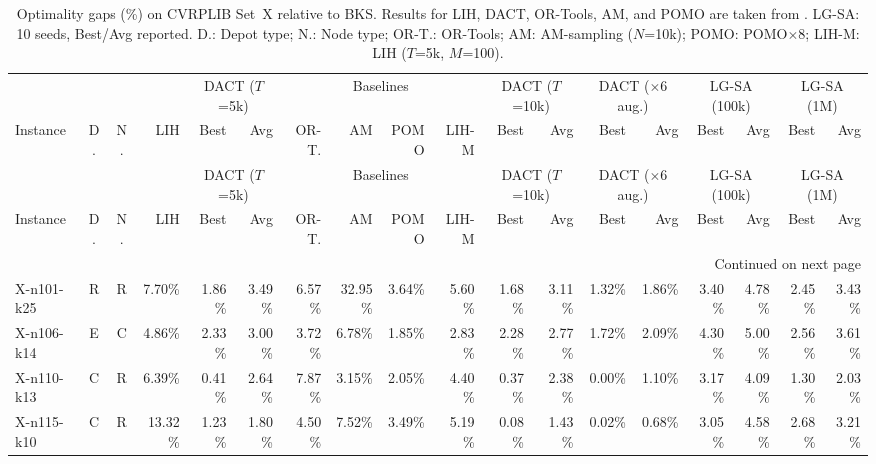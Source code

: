 \documentclass[letterpaper]{article} %
\begin{document}
\clearpage
\onecolumn
\begin{landscape}
\centering
\scriptsize
\setlength{\tabcolsep}{3pt}
\begin{longtable}{@{}l c c r rr rrrr rr rr rr rr@{}}
\caption{Optimality gaps (\%) on CVRPLIB Set~X \citep{uchoa_new_2017} relative to BKS. Results for LIH, DACT, OR-Tools, AM, and POMO are taken from \citet{ma_learning_2021}. LG-SA: 10 seeds, Best/Avg reported. D.: Depot type; N.: Node type; OR-T.: OR-Tools; AM: AM-sampling ($N$=10k); POMO: POMO$\times$8; LIH-M: LIH ($T$=5k, $M$=100).}
\label{tab:uchoa_benchmark} \\
\toprule
& & & & \multicolumn{2}{c}{DACT ($T$=5k)} & \multicolumn{4}{c}{Baselines} & \multicolumn{2}{c}{DACT ($T$=10k)} & \multicolumn{2}{c}{DACT ($\times$6 aug.)} & \multicolumn{2}{c}{LG-SA (100k)} & \multicolumn{2}{c}{LG-SA (1M)} \\
\cmidrule(lr){5-6}\cmidrule(lr){7-10}\cmidrule(lr){11-12}\cmidrule(lr){13-14}\cmidrule(lr){15-16}\cmidrule(lr){17-18}
Instance & D. & N. & LIH & Best & Avg & OR-T. & AM & POMO & LIH-M & Best & Avg & Best & Avg & Best & Avg & Best & Avg \\
\midrule
\endfirsthead
\toprule
& & & & \multicolumn{2}{c}{DACT ($T$=5k)} & \multicolumn{4}{c}{Baselines} & \multicolumn{2}{c}{DACT ($T$=10k)} & \multicolumn{2}{c}{DACT ($\times$6 aug.)} & \multicolumn{2}{c}{LG-SA (100k)} & \multicolumn{2}{c}{LG-SA (1M)} \\
\cmidrule(lr){5-6}\cmidrule(lr){7-10}\cmidrule(lr){11-12}\cmidrule(lr){13-14}\cmidrule(lr){15-16}\cmidrule(lr){17-18}
Instance & D. & N. & LIH & Best & Avg & OR-T. & AM & POMO & LIH-M & Best & Avg & Best & Avg & Best & Avg & Best & Avg \\
\midrule
\endhead
\midrule
\multicolumn{18}{r}{Continued on next page} \\
\midrule
\endfoot
\bottomrule
\endlastfoot
X-n101-k25 & R & R & 7.70\% & 1.86\% & 3.49\% & 6.57\% & 32.95\% & 3.64\% & 5.60\% & 1.68\% & 3.11\% & 1.32\% & 1.86\% & 3.40\% & 4.78\% & 2.45\% & 3.43\% \\
X-n106-k14 & E & C & 4.86\% & 2.33\% & 3.00\% & 3.72\% & 6.78\% & 1.85\% & 2.83\% & 2.28\% & 2.77\% & 1.72\% & 2.09\% & 4.30\% & 5.00\% & 2.56\% & 3.61\% \\
X-n110-k13 & C & R & 6.39\% & 0.41\% & 2.64\% & 7.87\% & 3.15\% & 2.05\% & 4.40\% & 0.37\% & 2.38\% & 0.00\% & 1.10\% & 3.17\% & 4.09\% & 1.30\% & 2.03\% \\
X-n115-k10 & C & R & 13.32\% & 1.23\% & 1.80\% & 4.50\% & 7.52\% & 3.49\% & 5.19\% & 0.08\% & 1.43\% & 0.02\% & 0.68\% & 3.05\% & 4.58\% & 2.68\% & 3.21\% \\

\end{longtable}
\end{landscape}
\end{document}
